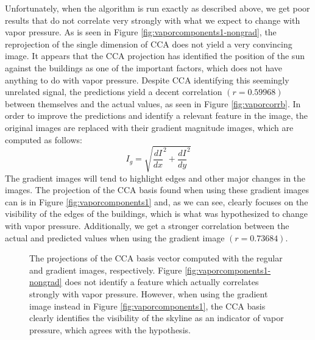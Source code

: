 Unfortunately, when the algorithm is run exactly as described above, we get poor results that do not correlate very strongly with what we expect to change with vapor pressure. As is seen in Figure \ref{fig:vaporcomponents1-nongrad}, the reprojection of the single dimension of CCA does not yield a very convincing image. It appears that the CCA projection has identified the position of the sun against the buildings as one of the important factors, which does not have anything to do with vapor pressure. Despite CCA identifying this seemingly unrelated signal, the predictions yield a decent correlation $(r=0.59968)$ between themselves and the actual values, as seen in Figure \ref{fig:vaporcorrb}. In order to improve the predictions and identify a relevant feature in the image, the original images are replaced with their gradient magnitude images, which are computed as follows:
\begin{equation}\label{eq:grad}I_g=\sqrt{\frac{dI}{dx}^2 + \frac{dI}{dy}^2}\end{equation}
The gradient images will tend to highlight edges and other major changes in the images. The projection of the CCA basis found when using these gradient images can is in Figure \ref{fig:vaporcomponents1} and, as we can see, clearly focuses on the visibility of the edges of the buildings, which is what was hypothesized to change with vapor pressure. Additionally, we get a stronger correlation between the actual and predicted values when using the gradient image $(r=0.73684)$.
\begin{figure}
	\centering
	\caption[The projections of the CCA basis vector computed with the regular and gradient images]{The projections of the CCA basis vector computed with the regular and gradient images, respectively. Figure \ref{fig:vaporcomponents1-nongrad} does not identify a feature which actually correlates strongly with vapor pressure. However, when using the gradient image instead in Figure \ref{fig:vaporcomponents1}, the CCA basis clearly identifies the visibility of the skyline as an indicator of vapor pressure, which agrees with the hypothesis.}
	\label{fig:vaporcomponents}
\end{figure}
